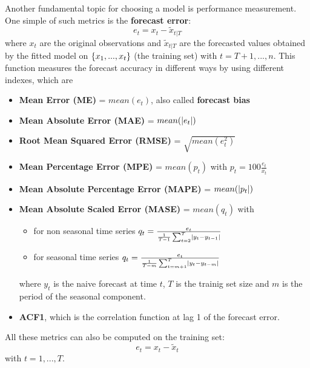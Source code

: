 Another fundamental topic for choosing a model is performance measurement. One simple of such metrics is the \textbf{forecast error}:
\[
     e_t=x_t-\tilde{x}_{t|T} 
\]
where $x_t$ are the original observations and $\tilde{x}_{t|T}$ are the forecasted values obtained by the fitted model on $\left\{x_1,...,x_t\right\}$ (the training set) with $t=T+1,...,n$. This function measures the forecast accuracy in different ways by using different indexes, which are
\begin{itemize}
    \item \textbf{Mean Error (ME)} = $mean(e_t)$, also called \textbf{forecast bias}
    \item \textbf{Mean Absolute Error (MAE)} = $mean(\left|e_t\right|)$
    \item \textbf{Root Mean Squared Error (RMSE)} = $\sqrt{mean(e_t^2)}$
    \item \textbf{Mean Percentage Error (MPE)} = $mean(p_t)$ with $p_t=100\frac{e_t}{x_t}$
    \item \textbf{Mean Absolute Percentage Error (MAPE)} = $mean(\left|p_t\right|)$
    \item \textbf{Mean Absolute Scaled Error (MASE)} = $mean(q_t)$ with
        \begin{itemize}
            \item for non seasonal time series $q_t=\frac{e_t}{\frac{1}{T-1}\sum_{t=2}^T\left|y_t-y_{t-1}\right|}$
            \item for seasonal time series $q_t=\frac{e_t}{\frac{1}{T-m}\sum_{t=m+1}^T\left|y_t-y_{t-m}\right|}$
        \end{itemize}
        where $y_t$ is the naive forecast at time $t$, $T$ is the trainig set size and $m$ is the period of the seasonal component.
    \item \textbf{ACF1}, which is the correlation function at lag 1 of the forecast error.
\end{itemize}
All these metrics can also be computed on the training set:
\[
    e_t=x_t-\tilde{x}_t  
\]
with $t=1,...,T$.

